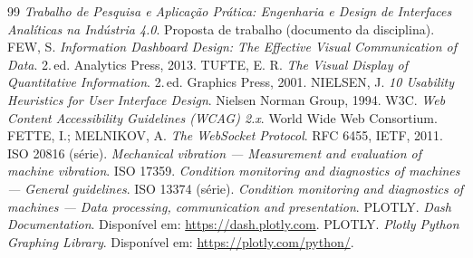 \documentclass[12pt,a4paper]{article}
\begin{document}
\begin{thebibliography}{99}
 \textit{Trabalho de Pesquisa e Aplicação Prática: Engenharia e Design de Interfaces Analíticas na Indústria 4.0}. Proposta de trabalho (documento da disciplina).
 FEW, S. \textit{Information Dashboard Design: The Effective Visual Communication of Data}. 2.\,ed. Analytics Press, 2013.
 TUFTE, E. R. \textit{The Visual Display of Quantitative Information}. 2.\,ed. Graphics Press, 2001.
 NIELSEN, J. \textit{10 Usability Heuristics for User Interface Design}. Nielsen Norman Group, 1994.
 W3C. \textit{Web Content Accessibility Guidelines (WCAG) 2.x}. World Wide Web Consortium.
 FETTE, I.; MELNIKOV, A. \textit{The WebSocket Protocol}. RFC 6455, IETF, 2011.
 ISO 20816 (série). \textit{Mechanical vibration --- Measurement and evaluation of machine vibration}.
 ISO 17359. \textit{Condition monitoring and diagnostics of machines --- General guidelines}.
 ISO 13374 (série). \textit{Condition monitoring and diagnostics of machines --- Data processing, communication and presentation}.
 PLOTLY. \textit{Dash Documentation}. Disponível em: \url{https://dash.plotly.com}.
 PLOTLY. \textit{Plotly Python Graphing Library}. Disponível em: \url{https://plotly.com/python/}.
\end{thebibliography}
\end{document}
